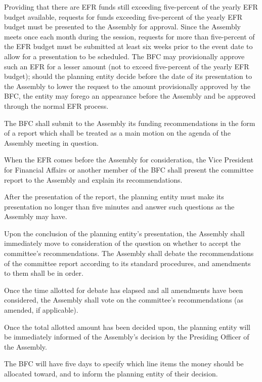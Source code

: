 \begin{bylaws-number}
\begin{bylaws-number}
  \item Providing that there are EFR funds still exceeding five-percent of the yearly EFR budget available, requests for funds exceeding five-percent of the yearly EFR budget must be presented to the Assembly for approval. Since the Assembly meets once each month during the session, requests for more than five-percent of the EFR budget must be submitted at least six weeks prior to the event date to allow for a presentation to be scheduled. The BFC may provisionally approve such an EFR for a lesser amount (not to exceed five-percent of the yearly EFR budget); should the planning entity decide before the date of its presentation to the Assembly to lower the request to the amount provisionally approved by the BFC, the entity may forego an appearance before the Assembly and be approved through the normal EFR process.
  \item The BFC shall submit to the Assembly its funding recommendations in the form of a report which shall be treated as a main motion on the agenda of the Assembly meeting in question.
  \item When the EFR comes before the Assembly for consideration, the Vice President for Financial Affairs or another member of the BFC shall present the committee report to the Assembly and explain its recommendations.
  \item After the presentation of the report, the planning entity must make its presentation no longer than five minutes and answer such questions as the Assembly may have.
  \item Upon the conclusion of the planning entity’s presentation, the Assembly shall immediately move to consideration of the question on whether to accept the committee’s recommendations. The Assembly shall debate the recommendations of the committee report according to its standard procedures, and amendments to them shall be in order.
  \item Once the time allotted for debate has elapsed and all amendments have been considered, the Assembly shall vote on the committee’s recommendations (as amended, if applicable).
  \item Once the total allotted amount has been decided upon, the planning entity will be immediately informed of the Assembly’s decision by the Presiding Officer of the Assembly.
  \item The BFC will have five days to specify which line items the money should be allocated toward, and to inform the planning entity of their decision.
\end{bylaws-number}

\end{bylaws-number}
